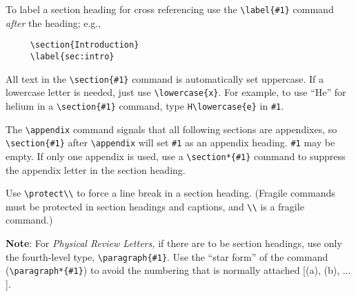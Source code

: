 To label a section heading for cross referencing use the \verb+\label{#1}+
command {\em after\/} the heading; e.g.,
\begin{verbatim}
     \section{Introduction}
     \label{sec:intro}
\end{verbatim}

All text in the \verb+\section{#1}+ command is automatically set uppercase.
If a lowercase letter is needed, just use \verb+\lowercase{x}+. For
example, to use ``He'' for helium in a \verb+\section{#1}+ command, type
\verb+H\lowercase{e}+ in \verb+#1+.

The \verb+\appendix+ command signals that all following sections are
appendixes, so \verb+\section{#1}+ after \verb+\appendix+ will set
\verb+#1+ as an appendix heading. \verb+#1+ may be empty. If only one
appendix is used, use a \verb+\section*{#1}+ command to suppress the
appendix letter in the section heading.

Use \verb+\protect\\+ to force a line break in a section heading. (Fragile
commands must be protected in section headings and captions, and \verb+\\+
is a fragile command.)

{\bf Note\/}: For {\em Physical Review Letters,} if there are to be section
headings, use only the fourth-level type, \verb+\paragraph{#1}+. Use the
``star form'' of the command (\verb+\paragraph*{#1}+) to avoid the
numbering that is normally attached [(a), (b), $\ldots$].


